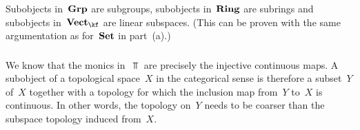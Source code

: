 \subsubsection{}

Subobjects in~$\mathbf{Grp}$ are subgroups, subobjects in~$\mathbf{Ring}$ are subrings and subobjects in~$\Vect{\kf}$ are linear subspaces.
(This can be proven with the same argumentation as for~$\mathbf{Set}$ in part~(a).)



\subsubsection{}

We know that the monics in~$\Top$ are precisely the injective continuous maps.
A subobject of a topological space~$X$ in the categorical sense is therefore a subset~$Y$ of~$X$ together with a topology for which the inclusion map from~$Y$ to~$X$ is continuous.
In other words, the topology on~$Y$ needs to be coarser than the subspace topology induced from~$X$.
